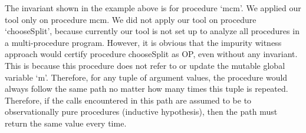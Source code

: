 The invariant shown in the example above is for procedure `mcm'. We applied
our tool only on procedure mcm. We did not apply our tool on procedure
`chooseSplit', because currently our tool is not set up to analyze all
procedures in a multi-procedure program. However, it is obvious that the
impurity witness approach would certify procedure chooseSplit as OP, even
without any invariant. This is because this procedure does not refer to or
update the mutable global variable `m'. Therefore, for any tuple of
argument values, the procedure would always follow the same path no matter
how many times this tuple is repeated. Therefore, if the calls encountered in
this path are assumed to be to observationally pure procedures (inductive
hypothesis), then the path must return the same value every time.
